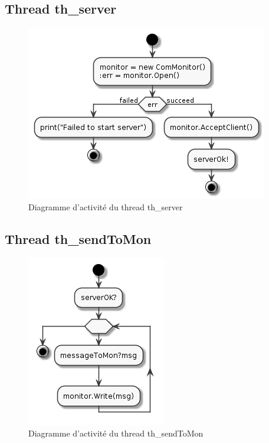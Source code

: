 \documentclass[11pt,a4paper]{paper}
\begin{document}
\subsection{Thread th\_server}
 \begin{figure}[htbp]
\begin{center}
\includegraphics[scale=0.4]{figures_pdf/activity/th_server}
\end{center}
\caption{Diagramme d'activité du thread th\_server}
\end{figure}
\FloatBarrier

\subsection{Thread th\_sendToMon}
 \begin{figure}[htbp]
\begin{center}
\includegraphics[scale=0.4]{figures_pdf/activity/th_sendToMon}
\end{center}
\caption{Diagramme d'activité du thread th\_sendToMon}
\end{figure}
\FloatBarrier
\end{document}
